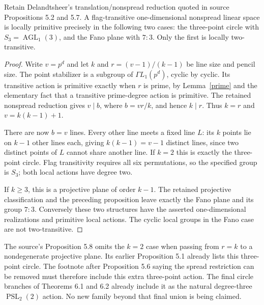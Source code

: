 \begin{proposition}\label{nonspread}
Retain Delandtsheer's translation/nonspread reduction quoted in source
Propositions 5.2 and 5.7. A flag-transitive one-dimensional nonspread
linear space is locally primitive precisely in the following two cases:
the three-point circle with $S_3=\operatorname{AGL}_1(3)$, and the
Fano plane with $7:3$. Only the first is locally two-transitive.
\end{proposition}
\begin{proof}
Write $v=p^d$ and let $k$ and $r=(v-1)/(k-1)$ be line size and pencil
size. The point stabilizer is a subgroup of $\Gamma L_1(p^d)$,
cyclic by cyclic. Its transitive action is primitive exactly when
$r$ is prime, by Lemma~\ref{prime} and the elementary fact that a
transitive prime-degree action is primitive. The retained nonspread
reduction gives $v\mid b$, where $b=vr/k$, and hence $k\mid r$.
Thus $k=r$ and $v=k(k-1)+1$.

There are now $b=v$ lines. Every other line meets a fixed line $L$:
its $k$ points lie on $k-1$ other lines each, giving $k(k-1)=v-1$
distinct lines, since two distinct points of $L$ cannot share another
line. If $k=2$ this is exactly the three-point circle. Flag transitivity
requires all six permutations, so the specified group is $S_3$; both
local actions have degree two.

If $k\ge3$, this is a projective plane of order $k-1$. The retained
projective classification and the preceding proposition leave exactly
the Fano plane and its group $7:3$. Conversely these two structures
have the asserted one-dimensional realizations and primitive local
actions. The cyclic local groups in the Fano case are not two-transitive.
\end{proof}

The source's Proposition 5.8 omits the $k=2$ case when passing from
$r=k$ to a nondegenerate projective plane. Its earlier Proposition 5.1
already lists this three-point circle. The footnote after Proposition 5.6
saying the spread restriction can be removed must therefore include this
extra three-point action. The final circle branches of Theorems 6.1
and 6.2 already include it as the natural degree-three $\operatorname{PSL}_2(2)$
action. No new family beyond that final union is being claimed.
